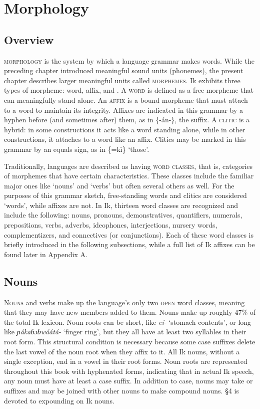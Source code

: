 \section{Morphology}\label{sec:3}
 
\subsection{Overview}\label{sec:3.1}
\largerpage

\textsc{morphology} is the system by which a language grammar makes words. While the preceding chapter introduced meaningful sound units (phonemes), the pres\-ent chapter describes larger meaningful units called \textsc{morphemes}. Ik exhibits three types of morpheme: word, affix, and . A \textsc{word} is defined as a free morpheme that can meaningfully stand alone. An \textsc{affix} is a bound morpheme that must attach to a word to maintain its integrity. Affixes are indicated in this grammar by a hyphen before (and sometimes after) them, as in \{-án-\}, the  suffix. A \textsc{clitic} is a hybrid: in some constructions it acts like a word standing alone, while in other constructions, it attaches to a word like an affix. Clitics may be marked in this grammar by an equals sign, as in \{=kì\} ‘those’. 

Traditionally, languages are described as having \textsc{word classes}, that is, categories of morphemes that have certain characteristics. These classes include the familiar major ones like ‘nouns’ and ‘verbs’ but often several others as well. For the purposes of this grammar sketch, free-standing words and clitics are considered ‘words’, while affixes are not. In Ik, thirteen word classes are recognized and include the following: nouns, pronouns, demonstratives, quantifiers, numerals, prepositions, verbs, adverbs, ideophones, interjections, nursery words, complementizers, and connectives (or conjunctions). Each of these word classes is briefly introduced in the following subsections, while a full list of Ik affixes can be found later in Appendix A.
 
\subsection{Nouns}\label{sec:3.2}


\textsc{Nouns} and verbs make up the language’s only two \textsc{open} word classes, meaning that they may have new members added to them. Nouns make up roughly 47\% of the total Ik lexicon. Noun roots can be short, like \textit{eí-} ‘stomach contents’, or long like \textit{ɲákaɓɔɓwáátá-} ‘finger ring’, but they all have at least two syllables in their root form. This structural condition is necessary because some case suffixes delete the last vowel of the noun root when they affix to it. All Ik nouns, without a single exception, end in a vowel in their root forms. Noun roots are represented throughout this book with hyphenated forms, indicating that in actual Ik speech, any noun must have at least a case suffix. In addition to case, nouns may take  or  suffixes and may be joined with other nouns to make compound nouns. §4 is devoted to expounding on Ik nouns.
 
